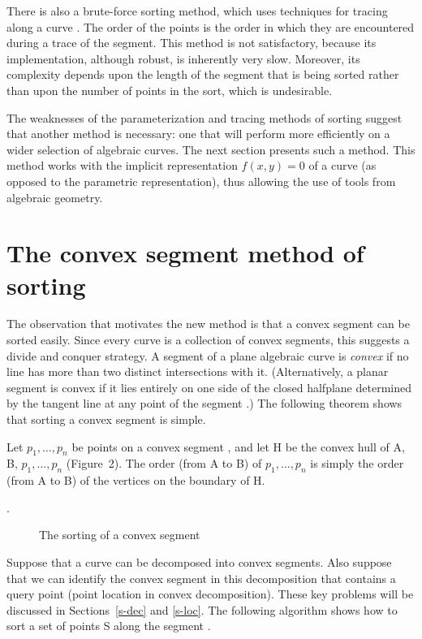 There is also a brute-force sorting method, which uses techniques for
tracing along a curve \cite{bhhl}.
The order of the points is the order in which they are encountered during
a trace of the segment.
This method is not satisfactory, because its implementation, although robust, is 
inherently very slow.
Moreover, its complexity depends upon the length of the segment that is being
sorted rather than upon the number of points in the sort, which is 
undesirable.

The weaknesses of the parameterization and tracing methods of sorting 
suggest that another method is necessary: one that will perform more
efficiently on a wider selection of algebraic curves.
The next section presents such a method.
This method works with the implicit representation $f(x,y)=0$ of a curve
(as opposed to the parametric representation),
thus allowing the use of tools from algebraic geometry.

\section{The convex segment method of sorting}
\label{co}

The observation that motivates the new method is that 
a convex segment can be sorted easily.
Since every curve is a collection of convex segments,
this suggests a divide and conquer strategy.
A segment of a plane algebraic curve is {\em convex} if no line has more than 
two distinct intersections with it.
(Alternatively, a planar segment is convex if it lies entirely on one side of
the closed halfplane determined by the tangent line at any point of
the segment \cite{Do}.)
The following theorem shows that sorting a convex segment is simple.

\begin{theorem}
\label{T-s}
Let $p_{1},\ldots,p_{n}$ be points on a convex segment , 
and let H be the convex hull of A, B, $p_{1},\ldots,p_{n}$ (Figure~2).
The order (from A to B) of $p_{1},\ldots,p_{n}$ is simply 
the order (from A to B) of the vertices on the boundary of H.
\end{theorem}
\cite[p. 20]{jj}.
\QED

\begin{figure}[htbp]\vspace{2.25in}\label{2.3}\caption{The sorting of a convex 
segment}\end{figure}  %

Suppose that a curve can be decomposed into convex segments.
Also suppose that we can identify the convex segment in this decomposition
that contains a query point (point location in convex decomposition).
These key problems will be discussed in 
Sections~\ref{s-dec} and \ref{s-loc}.
The following algorithm shows how to sort a set of points S 
along the segment .

